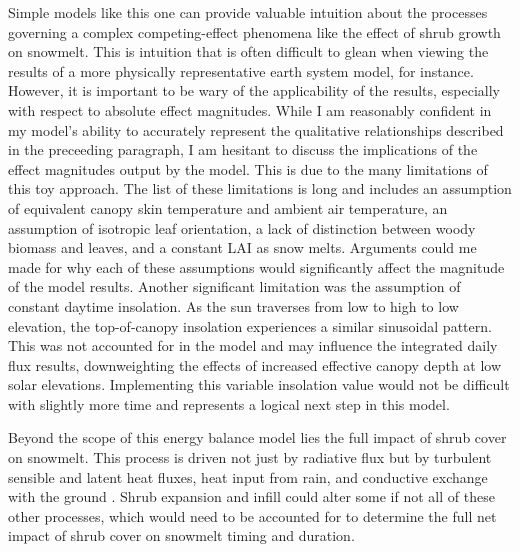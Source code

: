 \documentclass[
10pt, %
letterpaper, %
oneside, %
headinclude,footinclude, %
BCOR5mm, %
]{scrartcl}
\begin{document}
Simple models like this one can provide valuable intuition about the processes governing a complex competing-effect phenomena like the effect of shrub growth on snowmelt. This is intuition that is often difficult to glean when viewing the results of a more physically representative earth system model, for instance. However, it is important to be wary of the applicability of the results, especially with respect to absolute effect magnitudes. While I am reasonably confident in my model's ability to accurately represent the qualitative relationships described in the preceeding paragraph, I am hesitant to discuss the implications of the effect magnitudes output by the model. This is due to the many limitations of this toy approach. The list of these limitations is long and includes an assumption of equivalent canopy skin temperature and ambient air temperature, an assumption of isotropic leaf orientation, a lack of distinction between woody biomass and leaves, and a constant LAI as snow melts. Arguments could me made for why each of these assumptions would significantly affect the magnitude of the model results. Another significant limitation was the assumption of constant daytime insolation. As the sun traverses from low to high to low elevation, the top-of-canopy insolation experiences a similar sinusoidal pattern. This was not accounted for in the model and may influence the integrated daily flux results, downweighting the effects of increased effective canopy depth at low solar elevations. Implementing this variable insolation value would not be difficult with slightly more time and represents a logical next step in this model.

Beyond the scope of this energy balance model lies the full impact of shrub cover on snowmelt. This process is driven not just by radiative flux but by turbulent sensible and latent heat fluxes, heat input from rain, and conductive exchange with the ground \cite{serreze_snow_????}. Shrub expansion and infill could alter some if not all of these other processes, which would need to be accounted for to determine the full net impact of shrub cover on snowmelt timing and duration.


\renewcommand{\refname}{\spacedlowsmallcaps{References}} %




\end{document}
